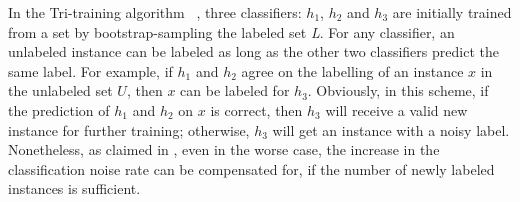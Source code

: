 \documentclass[english]{jnlp_1.4}
\begin{document}
In the Tri-training algorithm ~\cite{Zhi05}, three classifiers:
$h_{1}$, $h_{2}$ and $h_{3}$ are initially trained from a set by
bootstrap-sampling the labeled set \textit{L}. For any classifier,
an unlabeled instance can be labeled as long as the other two
classifiers predict the same label. For example, if $h_{1}$ and
$h_{2}$ agree on the labelling of an instance $x$ in the unlabeled
set $U$, then $x$ can be labeled for $h_{3}$. Obviously, in this
scheme, if the prediction of $h_{1}$ and $h_{2}$ on $x$ is
correct, then $h_{3}$ will receive a valid new instance for
further training; otherwise, $h_{3}$ will get an instance with a
noisy label. Nonetheless, as claimed in \cite{Zhi05}, even in the
worse case, the increase in the classification noise rate can be
compensated for, if the number of newly labeled instances is
sufficient.
\end{document}
